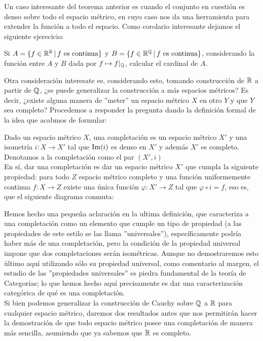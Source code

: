 \documentclass[12pt,a4paper]{book}
\begin{document}
Un caso interesante del teorema anterior es cuando el conjunto en cuestión es denso sobre todo el espacio métrico, en cuyo caso nos da una herramienta para extender la función a todo el espacio. Como corolario interesante dejamos el siguiente ejerecicio:
\begin{ej} Si $A= \{ f \in \mathbb{R}^{\mathbb{R}} \,\vert\, f \mbox{ es continua}\}$ y $B = \{ f \in \mathbb{R}^{\mathbb{Q}} \,\vert\, f \mbox{ es continua}\}$, considerando la función entre $A$ y $B$ dada por $ f \mapsto f\vert_{\mathbb{Q}}$, calcular el cardinal de $A$.
\end{ej}
Otra consideración interesate es, considerando esto, tomando construcción de $\mathbb{R}$ a partir de $\mathbb{Q}$, ¿se puede generalizar la construcción a más espacios métricos? Es decir, ¿existe alguna manera de ''meter'' un espacio métrico $X$ en otro $Y$ y que $Y$ sea completo? Procedemos a responder la pregunta dando la definición formal de la idea que acabmos de formular:
\begin{defi}
Dado un espacio métrico $X$, una completación es un espacio métrico $X'$ y una isometría $i: X \rightarrow X'$ tal que $\mbox{Im}(i)$ es denso en $X'$ y además $X'$ es completo. Denotamos a la completación como el par $(X',i)$\\
En sí, dar una completación es dar un espacio métrico $X'$ que cumpla la siguiente propiedad: para todo $Z$ espacio métrico completo y una función uniformemente continua $f:X \rightarrow Z$ existe una única función $\varphi:X' \rightarrow Z$ tal que $\varphi \circ i = f$, eso es, que el siguiente diagrama conmuta:

\end{defi}
Hemos hecho una pequeña aclaración en la ultima definición, que caracteriza a una completación como un elemento que cumple un tipo de propiedad (a las propiedades de este estilo se las llama ''universales''), específicamente podría haber más de una completación, pero la condición de la propiedad universal impone que dos completaciones serán isométricas. Aunque no demostraremos esto último aquí utilizando sólo su propiedad universal, como comentario al margen, el estudio de las ''propiedades universales'' es piedra fundamental de la teoría de Categorías; lo que hemos hecho aquí precisamente es dar una caracterización categórica de qué es una completación.\\[0.5cm]
Si bien podemos generalizar la construcción de Cauchy sobre $\mathbb{Q}$ a $\mathbb{R}$ para cualquier espacio métrico, daremos dos resultados antes que nos permitirán hacer la demostración de que todo espacio métrico posee una completación de manera más sencilla, asumiendo que ya sabemos que $\mathbb{R}$ es completo.
\end{document}
